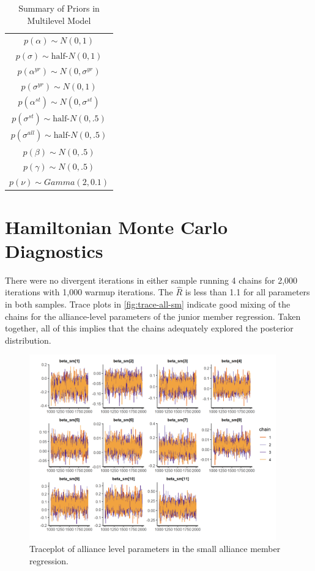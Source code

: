 \documentclass[12pt]{article}
\begin{document}
\begin{table} %
\begin{center}
\begin{tabular}{c} 
$ p(\alpha) \sim N(0, 1)$  \\
$ p(\sigma) \sim \mbox{half-}N(0, 1) $ \\
$ p(\alpha^{yr}) \sim N(0, \sigma^{yr}) $ \\ 
$ p(\sigma^{yr}) \sim N(0, 1) $ \\
$ p(\alpha^{st}) \sim N(0, \sigma^{st}) $ \\ 
$ p(\sigma^{st}) \sim \mbox{half-}N(0, .5) $ \\ 
$ p(\sigma^{all}) \sim \mbox{half-}N(0, .5) $ \\
$ p(\beta) \sim N(0, .5) $ \\
$ p(\gamma) \sim N(0, .5) $ \\ 
$ p(\nu) \sim Gamma(2, 0.1)$ 
\end{tabular} 
\caption{Summary of Priors in Multilevel Model} 
\label{tab:priors}
\end{center} 
\end{table} 


\section{Hamiltonian Monte Carlo Diagnostics}

There were no divergent iterations in either sample running 4 chains for 2,000 iterations with 1,000 warmup iterations. 
The $\hat{R}$ is less than 1.1 for all parameters in both samples. 
Trace plots in \autoref{fig:trace-all-sm} indicate good mixing of the chains for the alliance-level parameters of the junior member regression. 
Taken together, all of this implies that the chains adequately explored the posterior distribution. 

\begin{figure}[htbp]
	\centering
		\includegraphics[width=0.95\textwidth]{trace-all-sm.png}
	\caption{Traceplot of alliance level parameters in the small alliance member regression.}
	\label{fig:trace-all-sm}
\end{figure}
\end{document}
